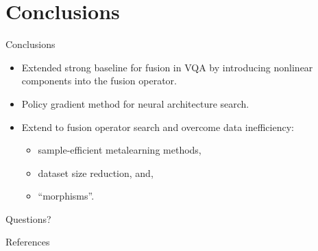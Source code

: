 \documentclass{beamer}
\begin{document}
\section{Conclusions}

\begin{frame}[fragile]{Conclusions}
        \begin{itemize}[<+- | alert@+>]
                \item Extended strong baseline for fusion in VQA by introducing
                        nonlinear components into the fusion operator.

                \item Policy gradient method for neural architecture search.

                \item Extend to fusion operator search and overcome data
                        inefficiency:
                        \begin{itemize}
                                \item sample-efficient metalearning methods,

                                \item dataset size reduction, and,

                                \item ``morphisms''.
                        \end{itemize}
        \end{itemize}
\end{frame}

\begin{frame}[standout]
        Questions?
\end{frame}

\appendix

\begin{frame}[allowframebreaks]{References}
        
        
\end{frame}
\end{document}

